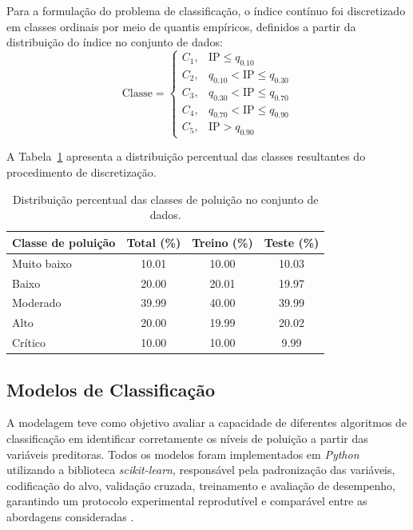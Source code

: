 Para a formulação do problema de classificação, o índice contínuo foi discretizado em classes ordinais por meio de quantis empíricos, definidos a partir da distribuição do índice no conjunto de dados:
\begin{equation}
\text{Classe} =
\begin{cases}
C_1, & \text{IP} \leq q_{0.10} \\
C_2, & q_{0.10} < \text{IP} \leq q_{0.30} \\
C_3, & q_{0.30} < \text{IP} \leq q_{0.70} \\
C_4, & q_{0.70} < \text{IP} \leq q_{0.90} \\
C_5, & \text{IP} > q_{0.90}
\end{cases}
\end{equation}

A Tabela~\ref{tab:caracterizacao} apresenta a distribuição percentual das classes resultantes do procedimento de discretização.


\begin{table}[htb!]
  \centering
  \caption{Distribuição percentual das classes de poluição no conjunto de dados.}
  \label{tab:caracterizacao}
  \begin{tabular}{l c c c}
    \toprule
    Classe de poluição & Total (\%) & Treino (\%) & Teste (\%) \\
    \midrule
    Muito baixo & 10.01 & 10.00 & 10.03 \\
    Baixo       & 20.00 & 20.01 & 19.97 \\
    Moderado    & 39.99 & 40.00 & 39.99 \\
    Alto        & 20.00 & 19.99 & 20.02 \\
    Crítico     & 10.00 & 10.00 & 9.99 \\
    \bottomrule
  \end{tabular}
\end{table}

\subsection{Modelos de Classificação}
\label{subsec:modelos}
A modelagem teve como objetivo avaliar a capacidade de diferentes algoritmos de classificação em identificar corretamente os níveis de poluição a partir das variáveis preditoras. Todos os modelos foram implementados em \textit{Python} utilizando a biblioteca \textit{scikit-learn}, responsável pela padronização das variáveis, codificação do alvo, validação cruzada, treinamento e avaliação de desempenho, garantindo um protocolo experimental reprodutível e comparável entre as abordagens consideradas \cite{scikit_learn}.

